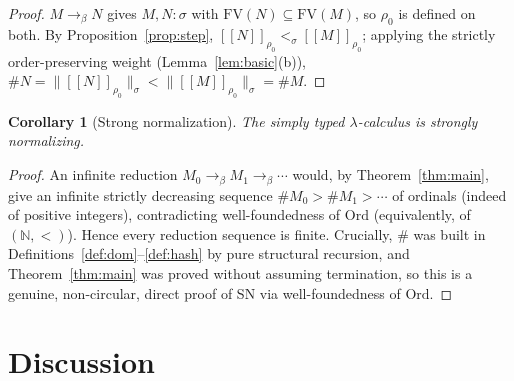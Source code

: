 \documentclass{amsart}
\newtheorem{corollary}{Corollary}
\theoremstyle{definition}
\newcommand{\Ord}{\mathrm{Ord}}
\newcommand{\interp}[1]{[\![#1]\!]}
\newcommand{\To}{\to_\beta}
\newcommand{\FV}{\mathrm{FV}}
\begin{document}
\begin{proof}
$M\To N$ gives $M,N:\sigma$ with $\FV(N)\subseteq\FV(M)$, so $\rho_0$ is defined on both.
By Proposition~\ref{prop:step}, $\interp{N}_{\rho_0}<_\sigma\interp{M}_{\rho_0}$; applying
the strictly order-preserving weight (Lemma~\ref{lem:basic}(b)),
$\#N=\|\interp{N}_{\rho_0}\|_\sigma<\|\interp{M}_{\rho_0}\|_\sigma=\#M$.
\end{proof}

\begin{corollary}[Strong normalization]\label{cor:SN}
The simply typed $\lambda$-calculus is strongly normalizing.
\end{corollary}

\begin{proof}
An infinite reduction $M_0\To M_1\To\cdots$ would, by Theorem~\ref{thm:main}, give an
infinite strictly decreasing sequence $\#M_0>\#M_1>\cdots$ of ordinals (indeed of positive
integers), contradicting well-foundedness of $\Ord$ (equivalently, of $(\mathbb N,<)$).
Hence every reduction sequence is finite. Crucially, $\#$ was built in
Definitions~\ref{def:dom}--\ref{def:hash} by pure structural recursion, and
Theorem~\ref{thm:main} was proved without assuming termination, so this is a genuine,
non-circular, direct proof of SN via well-foundedness of $\Ord$.
\end{proof}

\section*{Discussion}
\end{document}
